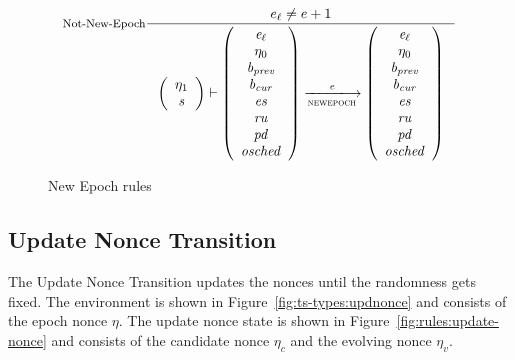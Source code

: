 \begin{figure}[ht]
  \begin{equation}\label{eq:not-new-epoch}
    \inference[Not-New-Epoch]
    {
      e_\ell \neq e + 1
    }
    {
      \left(
        {\begin{array}{c}
            \eta_1 \\
            \var{s} \\
        \end{array}}
      \right)
      \vdash
      {\left(\begin{array}{c}
            \var{e_\ell} \\
            \eta_0 \\
            \var{b_{prev}} \\
            \var{b_{cur}} \\
            \var{es} \\
            \var{ru} \\
            \var{pd} \\
            \var{osched}
      \end{array}\right)}
      \trans{newepoch}{\var{e}}
      {\left(\begin{array}{c}
            \var{e_\ell} \\
            \eta_0 \\
            \var{b_{prev}} \\
            \var{b_{cur}} \\
            \var{es} \\
            \var{ru} \\
            \var{pd} \\
            \var{osched}
      \end{array}\right)}
    }
  \end{equation}
  \caption{New Epoch rules}
  \label{fig:rules:new-epoch}
\end{figure}

\clearpage

\subsection{Update Nonce Transition}
\label{sec:update-nonces-trans}

The Update Nonce Transition updates the nonces until the randomness gets
fixed. The environment is shown in Figure~\ref{fig:ts-types:updnonce} and
consists of the epoch nonce $\eta$. The update nonce state is shown in
Figure~\ref{fig:rules:update-nonce} and consists of the candidate nonce
$\eta_c$ and the evolving nonce $\eta_v$.

